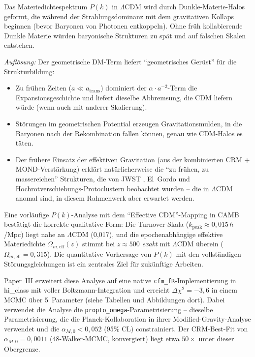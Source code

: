\documentclass[aps,prd,twocolumn,superscriptaddress,nofootinbib]{revtex4-2}
\begin{document}
Das Materiedichtespektrum $P(k)$ in $\Lambda$CDM wird durch Dunkle-Materie-Halos geformt, die w\"ahrend der Strahlungsdominanz mit dem gravitativen Kollaps beginnen (bevor Baryonen von Photonen entkoppeln). Ohne fr\"uh kollabierende Dunkle Materie w\"urden baryonische Strukturen zu sp\"at und auf falschen Skalen entstehen.

\textit{Aufl\"osung:} Der geometrische DM-Term liefert "`geometrisches Ger\"ust"' f\"ur die Strukturbildung:
\begin{itemize}
\item Zu fr\"uhen Zeiten ($a \ll a_{\mathrm{trans}}$) dominiert der $\alpha \cdot a^{-2}$-Term die Expansionsgeschichte und liefert dieselbe Abbremsung, die CDM liefern w\"urde (wenn auch mit anderer Skalierung).
\item St\"orungen im geometrischen Potential erzeugen Gravitationsmulden, in die Baryonen nach der Rekombination fallen k\"onnen, genau wie CDM-Halos es t\"aten.
\item Der fr\"uhere Einsatz der effektiven Gravitation (aus der kombinierten CRM + MOND-Verst\"arkung) erkl\"art nat\"urlicherweise die "`zu fr\"uhen, zu massereichen"' Strukturen, die von JWST \cite{Labbe2023}, El~Gordo \cite{Asencio2023} und Hochrotverschiebungs-Protoclustern \cite{Miller2018} beobachtet wurden -- die in $\Lambda$CDM anomal sind, in diesem Rahmenwerk aber erwartet werden.
\end{itemize}

Eine vorl\"aufige $P(k)$-Analyse mit dem "`Effective CDM"'-Mapping in CAMB \cite{Lewis2000} best\"atigt die korrekte qualitative Form: Die Turnover-Skala ($k_{\mathrm{peak}} \approx 0{,}015$\,$h$/Mpc) liegt nahe an $\Lambda$CDM (0{,}017), und die epochenabh\"angige effektive Materiedichte $\Omega_{m,\mathrm{eff}}(z)$ stimmt bei $z \approx 500$ \textit{exakt} mit $\Lambda$CDM \"uberein ($\Omega_{m,\mathrm{eff}} = 0{,}315$). Die quantitative Vorhersage von $P(k)$ mit den vollst\"andigen St\"orungsgleichungen ist ein zentrales Ziel f\"ur zuk\"unftige Arbeiten.

Paper~III \cite{Geiger2026c} erweitert diese Analyse auf eine native \texttt{cfm\_fR}-Implementierung in hi\_class mit voller Boltzmann-Integration und erreicht $\Delta\chi^2 = -3{,}6$ in einem MCMC \"uber 5~Parameter (siehe Tabellen und Abbildungen dort). Dabei verwendet die Analyse die \texttt{propto\_omega}-Parametrisierung -- dieselbe Parametrisierung, die die Planck-Kollaboration in ihrer Modified-Gravity-Analyse verwendet \cite{PlanckMG2016} und die $\alpha_{M,0} < 0{,}052$ (95\% CL) constrainiert. Der CRM-Best-Fit von $\alpha_{M,0} = 0{,}0011$ (48-Walker-MCMC, konvergiert) liegt etwa $50\times$ unter dieser Obergrenze.
\end{document}
